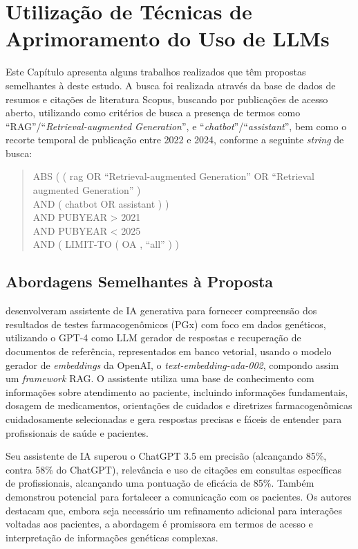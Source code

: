 \chapter{Utilização de Técnicas de Aprimoramento do Uso de LLMs}
\label{cap:Literatura}

Este Capítulo apresenta alguns trabalhos realizados que têm propostas semelhantes à deste estudo. A busca foi realizada através da base de dados de resumos e citações de literatura Scopus, buscando por publicações de acesso aberto, utilizando como critérios de busca a presença de termos como ``RAG''/``\textit{Retrieval-augmented Generation}'', e ``\textit{chatbot}''/``\textit{assistant}'', bem como o recorte temporal de publicação entre 2022 e 2024, conforme a seguinte \textit{string} de busca:

\begin{quote}
    {    
    \footnotesize
    \ttfamily
    \raggedright
    \sloppy    
    ABS ( ( rag OR ``Retrieval-augmented Generation'' OR ``Retrieval augmented Generation'' ) \\
    AND ( chatbot OR assistant ) ) \\
    AND PUBYEAR > 2021 \\
    AND PUBYEAR < 2025 \\
    AND ( LIMIT-TO ( OA , ``all'' ) )
    
    }
\end{quote}

\section{Abordagens Semelhantes à Proposta}
\label{sec:Literatura.1}

 desenvolveram assistente de IA generativa para fornecer compreensão dos resultados de testes farmacogenômicos (PGx) com foco em dados genéticos, utilizando o GPT-4 como \ac{LLM} gerador de respostas e recuperação de documentos de referência, representados em banco vetorial, usando o modelo gerador de \textit{embeddings} da OpenAI, o \textit{text-embedding-ada-002}, compondo assim um \textit{framework} \ac{RAG}. O assistente utiliza uma base de conhecimento com informações sobre atendimento ao paciente, incluindo informações fundamentais, dosagem de medicamentos, orientações de cuidados e diretrizes farmacogenômicas cuidadosamente selecionadas e gera respostas precisas e fáceis de entender para profissionais de saúde e pacientes.

Seu assistente de IA superou o ChatGPT 3.5 em precisão (alcançando 85\%, contra 58\% do ChatGPT), relevância e uso de citações em consultas específicas de profissionais, alcançando uma pontuação de eficácia de 85\%. Também demonstrou potencial para fortalecer a comunicação com os pacientes. Os autores destacam que, embora seja necessário um refinamento adicional para interações voltadas aos pacientes, a abordagem é promissora em termos de acesso e interpretação de informações genéticas complexas.

